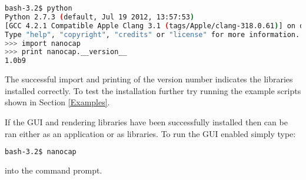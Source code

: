 \begin{lstlisting}[keywordstyle={\color{myterminalfont}},
			language={sh},
			commentstyle={\it\color{myterminalfont}},
			emphstyle={\ttb\color{myterminalfont}},
			stringstyle={\color{myterminalfont}},
			showstringspaces={false},
			otherkeywords={self},
			emph={MyClass,__init__},
			frame={},
			basicstyle={\ttm\color{myterminalfont}},
			morekeywords={True,False},
			captionpos={b},
			backgroundcolor={\color{myterminalbg}}]		
bash-3.2$ python
Python 2.7.3 (default, Jul 19 2012, 13:57:53) 
[GCC 4.2.1 Compatible Apple Clang 3.1 (tags/Apple/clang-318.0.61)] on darwin
Type "help", "copyright", "credits" or "license" for more information.
>>> import nanocap
>>> print nanocap.__version__
1.0b9
\end{lstlisting}

The successful import and printing of the version number indicates the libraries installed correctly. To test the installation further try running the example scripts shown in Section \ref{Examples}.

If the GUI and rendering libraries have been successfully installed then \nanocap can be ran either as an application or as libraries. To run the GUI enabled \nanocap simply type:
\begin{lstlisting}[keywordstyle={\color{myterminalfont}},
			language={sh},
			commentstyle={\it\color{myterminalfont}},
			emphstyle={\ttb\color{myterminalfont}},
			stringstyle={\color{myterminalfont}},
			showstringspaces={false},
			otherkeywords={self},
			emph={MyClass,__init__},
			frame={},
			basicstyle={\ttm\color{myterminalfont}},
			morekeywords={True,False},
			captionpos={b},
			backgroundcolor={\color{myterminalbg}}]		
bash-3.2$ nanocap
\end{lstlisting}

into the command prompt.



